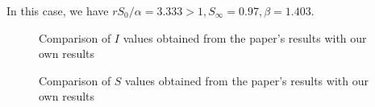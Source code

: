 \documentclass[10pt]{article}
\begin{document}
In this case, we have $r S_{0} / \alpha=3.333>1, S_{\infty}=0.97, \beta=1.403$. 
\begin{figure}[!htbp]
  \centering
  \hfill
  \caption{Comparison of \(I\) values obtained from the paper's results with our own results  }
\end{figure}
\begin{figure}[!htbp]
  \centering
  \hfill
  \caption{Comparison of \(S\) values obtained from the paper's results with our own results  }
\end{figure}
\end{document}
